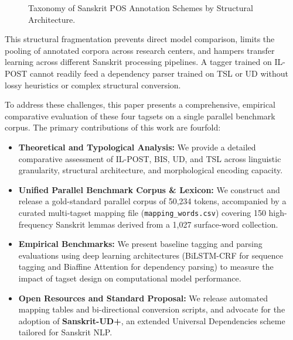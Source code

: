 \documentclass[11pt,a4paper]{article}
\begin{document}
\begin{figure}[htbp]
\centering
{}
\caption{Taxonomy of Sanskrit POS Annotation Schemes by Structural Architecture.}
\label{fig:taxonomy}
\end{figure}

This structural fragmentation prevents direct model comparison, limits the pooling of annotated corpora across research centers, and hampers transfer learning across different Sanskrit processing pipelines. A tagger trained on IL-POST cannot readily feed a dependency parser trained on TSL or UD without lossy heuristics or complex structural conversion.

To address these challenges, this paper presents a comprehensive, empirical comparative evaluation of these four tagsets on a single parallel benchmark corpus. The primary contributions of this work are fourfold:
\begin{itemize}[leftmargin=1.5em, itemsep=0.2em]
    \item \textbf{Theoretical and Typological Analysis:} We provide a detailed comparative assessment of IL-POST, BIS, UD, and TSL across linguistic granularity, structural architecture, and morphological encoding capacity.
    \item \textbf{Unified Parallel Benchmark Corpus \& Lexicon:} We construct and release a gold-standard parallel corpus of 50,234 tokens, accompanied by a curated multi-tagset mapping file (\texttt{mapping\_words.csv}) covering 150 high-frequency Sanskrit lemmas derived from a 1,027 surface-word collection.
    \item \textbf{Empirical Benchmarks:} We present baseline tagging and parsing evaluations using deep learning architectures (BiLSTM-CRF for sequence tagging and Biaffine Attention for dependency parsing) to measure the impact of tagset design on computational model performance.
    \item \textbf{Open Resources and Standard Proposal:} We release automated mapping tables and bi-directional conversion scripts, and advocate for the adoption of \textbf{Sanskrit-UD+}, an extended Universal Dependencies scheme tailored for Sanskrit NLP.
\end{itemize}
\end{document}
